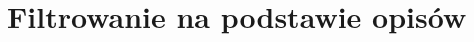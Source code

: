 \documentclass{pracamgr}
\begin{document}
  \section{Filtrowanie na podstawie opisów} %

\begin{thebibliography}{99}%






\end{thebibliography}
\end{document}
